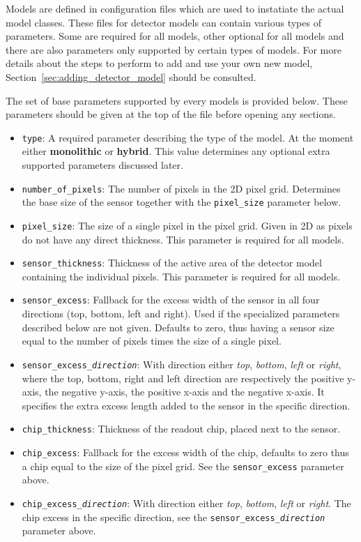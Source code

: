 Models are defined in configuration files which are used to instatiate the actual model classes.
These files for detector models can contain various types of parameters.
Some are required for all models, other optional for all models and there are also parameters only supported by certain types of models.
For more details about the steps to perform to add and use your own new model, Section~\ref{sec:adding_detector_model} should be consulted.

The set of base parameters supported by every models is provided below.
These parameters should be given at the top of the file before opening any sections.
\begin{itemize}
\item \texttt{type}: A required parameter describing the type of the model.
At the moment either \textbf{monolithic} or \textbf{hybrid}.
This value determines any optional extra supported parameters discussed later.
\item \texttt{number\_of\_pixels}: The number of pixels in the 2D pixel grid.
Determines the base size of the sensor together with the \texttt{pixel\_size} parameter below.
\item \texttt{pixel\_size}: The size of a single pixel in the pixel grid.
Given in 2D as pixels do not have any direct thickness.
This parameter is required for all models.
\item \texttt{sensor\_thickness}: Thickness of the active area of the detector model containing the individual pixels.
This parameter is required for all models.
\item \texttt{sensor\_excess}: Fallback for the excess width of the sensor in all four directions (top, bottom, left and right).
Used if the specialized parameters described below are not given.
Defaults to zero, thus having a sensor size equal to the number of pixels times the size of a single pixel.
\item \texttt{sensor\_excess\_\textit{direction}}: With direction either \textit{top}, \textit{bottom}, \textit{left} or \textit{right}, where the top, bottom, right and left direction are respectively the positive y-axis, the negative y-axis, the positive x-axis and the negative x-axis.
It specifies the extra excess length added to the sensor in the specific direction.
\item \texttt{chip\_thickness}: Thickness of the readout chip, placed next to the sensor.
\item \texttt{chip\_excess}: Fallback for the excess width of the chip, defaults to zero thus a chip equal to the size of the pixel grid.
See the \texttt{sensor\_excess} parameter above.
\item \texttt{chip\_excess\_\textit{direction}}: With direction either \textit{top}, \textit{bottom}, \textit{left} or \textit{right}.
The chip excess in the specific direction, see the \texttt{sensor\_excess\_\textit{direction}} parameter above.
\end{itemize}

